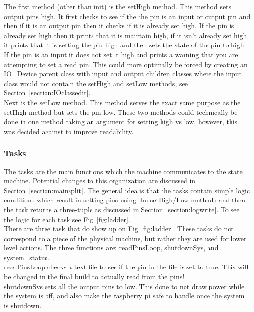\documentclass{article}
\begin{document}
The first method (other than init) is the setHigh method. This method sets output pins high. It first checks to see if the the pin is an input or output pin and then if it is an output pin then it checks if it is already set high. If the pin is already set high then it prints that it is maintain high, if it isn't already set high it prints that it is setting the pin high and then sets the state of the pin to high. If the pin is an input it does not set it high and prints a warning that you are attempting to set a read pin. This could more optimally be forced by creating an IO\_Device parent class with input and output children classes where the input class would not contain the setHigh and setLow methods, see Section~\ref{section:IOclassedit}.\\

Next is the setLow method. This method serves the exact same purpose as the setHigh method but sets the pin low. These two methods could technically be done in one method taking an argument for setting high vs low, however, this was decided against to improve readability.\\

\subsubsection{Tasks}
The tasks are the main functions which the machine communicates to the state machine. Potential changes to this organization are discussed in Section~\ref{section:mainsplit}. The general idea is that the tasks contain simple logic conditions which result in setting pins using the setHigh/Low methods and then the task returns a three-tuple as discussed in Section~\ref{section:logwrite}. To see the logic for each task see Fig~\ref{fig:ladder}. \\

There are three task that do show up on Fig~\ref{fig:ladder}. These tasks do not correspond to a piece of the physical machine, but rather they are used for lower level actions. The three functions are: readPinsLoop, shutdownSys, and system\_status. \\

readPinsLoop checks a text file to see if the pin in the file is set to true. This will be changed in the final build to actually read from the pins!\\

shutdownSys sets all the output pins to low. This done to not draw power while the system is off, and also make the raspberry pi safe to handle once the system is shutdown.\\
\end{document}

